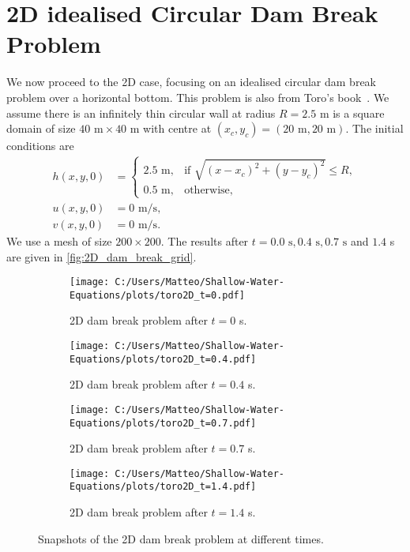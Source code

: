 \section{2D idealised Circular Dam Break Problem}
We now proceed to the 2D case, focusing on an idealised circular dam break problem over a horizontal bottom.
This problem is also from Toro's book~\cite{Toro2024}.
We assume there is an infinitely thin circular wall at radius $R = 2.5$ m is a square domain of size $40 \text{ m} \times 40 \text{ m}$ with centre at $(x_c,y_c) = (20 \text{ m}, 20 \text{ m})$.
The initial conditions are
\begin{align*}
    h(x,y,0) &= \begin{cases}
        2.5 \text{ m}, & \text{if } \sqrt{ {(x-x_c)}^2 + {(y-y_c)}^2 } \leq R, \\
        0.5 \text{ m}, & \text{otherwise},
    \end{cases} \\
    u(x,y,0) &= 0 \text{ m/s}, \\
    v(x,y,0) &= 0 \text{ m/s}.
\end{align*}
We use a mesh of size $200 \times 200$.
The results after $t=0.0 \text{ s}, 0.4 \text{ s}, 0.7 \text{ s}$ and $1.4$ s are given in \autoref{fig:2D_dam_break_grid}.
\begin{figure}[H]
    \centering
    \begin{subfigure}{0.49\textwidth}
        \centering
        \texttt{[image: C:/Users/Matteo/Shallow-Water-Equations/plots/toro2D\_t=0.pdf]}
        \caption{2D dam break problem after $t=0$ s.}\label{fig:2D_dam_break_t0}
    \end{subfigure}
    \hfill
    \begin{subfigure}{0.49\textwidth}
        \centering
        \texttt{[image: C:/Users/Matteo/Shallow-Water-Equations/plots/toro2D\_t=0.4.pdf]}
        \caption{2D dam break problem after $t=0.4$ s.}\label{fig:2D_dam_break_t0.4}
    \end{subfigure}

    \vspace{0.5cm} %

    \begin{subfigure}{0.49\textwidth}
        \centering
        \texttt{[image: C:/Users/Matteo/Shallow-Water-Equations/plots/toro2D\_t=0.7.pdf]}
        \caption{2D dam break problem after $t=0.7$ s.}\label{fig:2D_dam_break_t0.7}
    \end{subfigure}
    \hfill
    \begin{subfigure}{0.49\textwidth}
        \centering
        \texttt{[image: C:/Users/Matteo/Shallow-Water-Equations/plots/toro2D\_t=1.4.pdf]}
        \caption{2D dam break problem after $t=1.4$ s.}\label{fig:2D_dam_break_t1.4}
    \end{subfigure}

    \caption{Snapshots of the 2D dam break problem at different times.}\label{fig:2D_dam_break_grid}
\end{figure}

